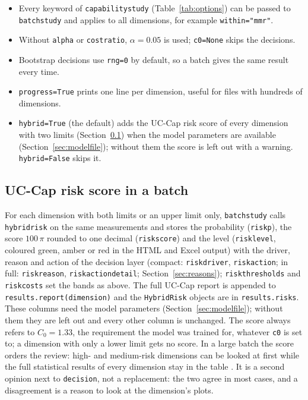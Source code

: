 \documentclass[a4paper,11pt,oneside,openany,parskip=half-,headings=standardclasses,toc=flat,numbers=noenddot]{scrbook}
\newcommand{\code}[1]{\texttt{\begingroup\def\_{\textunderscore\allowbreak}#1\endgroup}}
\newcommand{\secref}[1]{Section~\ref{#1}}
\newcommand{\tabref}[1]{Table~\ref{#1}}
\begin{document}
\begin{itemize}
\item Every keyword of \code{capability\_study} (\tabref{tab:options}) can be passed to \code{batch\_study} and
  applies to all dimensions, for example \code{within="mmr"}.
\item Without \code{alpha} or \code{cost\_ratio}, $\alpha = 0.05$ is used; \code{c0=None} skips the decisions.
\item Bootstrap decisions use \code{rng=0} by default, so a batch gives the same result every time.
\item \code{progress=True} prints one line per dimension, useful for files with hundreds of dimensions.
\item \code{hybrid=True} (the default) adds the UC-Cap risk score of every dimension with two limits
  (\secref{sec:batchrisk}) when the model parameters are available (\secref{sec:modelfile}); without them the
  score is left out with a warning. \code{hybrid=False} skips it.
\end{itemize}

\subsection{UC-Cap risk score in a batch}\label{sec:batchrisk}
For each dimension with both limits or an upper limit only, \code{batch\_study} calls \code{hybrid\_risk} on the same measurements and
stores the probability (\code{risk\_p}), the score $100\,\pi$ rounded to one decimal (\code{risk\_score}) and the
level (\code{risk\_level}, coloured green, amber or red in the HTML and Excel output) with the driver, reason and
action of the decision layer (compact: \code{risk\_driver}, \code{risk\_action}; in full: \code{risk\_reason},
\code{risk\_action\_detail}; \secref{sec:reasons}); \code{risk\_thresholds} and \code{risk\_costs} set the bands as above. The full UC-Cap report is
appended to \code{results.report(dimension)} and the \code{HybridRisk} objects are in \code{results.risks}.
These columns need the model parameters (\secref{sec:modelfile}); without them they are left out and every other
column is unchanged.
The score always refers to $C_0 = 1.33$, the requirement the model was trained for, whatever \code{c0} is set to;
a dimension with only a lower limit gets no score. In a large batch the score orders the review: high- and medium-risk dimensions
can be looked at first while the full statistical results of every dimension stay in the table
\cite[Sec.~5.2]{jy-hybrid}. It is a second opinion next to \code{decision}, not a replacement: the two agree in
most cases, and a disagreement is a reason to look at the dimension's plots.
\end{document}

